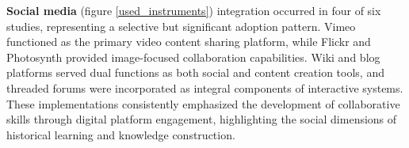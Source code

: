 \documentclass[
hf,
]{ceurart}
\begin{document}
\textbf{Social media} (figure \ref{used_instruments}) integration occurred in four of six studies, representing a selective but significant adoption pattern. Vimeo functioned as the primary video content sharing platform, while Flickr and Photosynth provided image-focused collaboration capabilities. Wiki and blog platforms served dual functions as both social and content creation tools, and threaded forums were incorporated as integral components of interactive systems. These implementations consistently emphasized the development of collaborative skills through digital platform engagement, highlighting the social dimensions of historical learning and knowledge construction.




\end{document}
